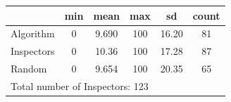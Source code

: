 {
\def\sym#1{\ifmmode^{#1}\else\(^{#1}\)\fi}
\begin{tabular}{l*{1}{ccccc}}
\toprule
            &         min&        mean&         max&          sd&       count\\
\midrule
Algorithm   &           0&       9.690&         100&       16.20&          81\\
Inspectors  &           0&       10.36&         100&       17.28&          87\\
Random      &           0&       9.654&         100&       20.35&          65\\
\bottomrule
\multicolumn{6}{l}{\footnotesize Total number of Inspectors: 123}\\
\end{tabular}
}
